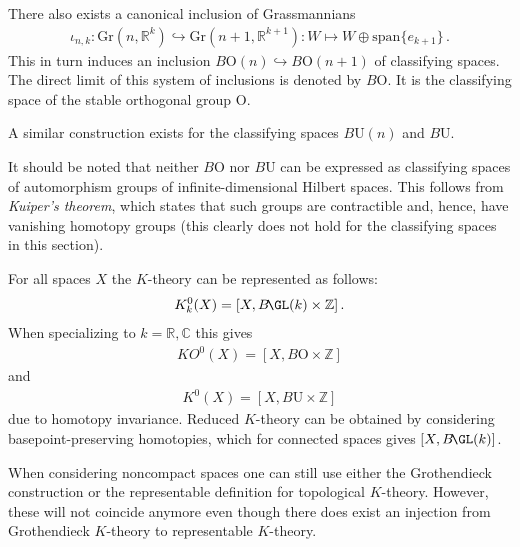 {\begin{property}
        There also exists a canonical inclusion of Grassmannians
        \begin{gather}
            \iota_{n,k}:\mathrm{Gr}(n,\mathbb{R}^k)\hookrightarrow \mathrm{Gr}(n+1,\mathbb{R}^{k+1}):W\mapsto W\oplus\mathrm{span}\{e_{k+1}\}\,.
        \end{gather}
        This in turn induces an inclusion $B\mathrm{O}(n)\hookrightarrow B\mathrm{O}(n+1)$ of classifying spaces. The direct limit of this system of inclusions is denoted by $B\mathrm{O}$. It is the classifying space of the stable orthogonal group $\mathrm{O}$.
    \end{property}
    \begin{remark}
        A similar construction exists for the classifying spaces $B\mathrm{U}(n)$ and $B\mathrm{U}$.
    \end{remark}
    \begin{remark}\label{k:kuiper_remark}
        It should be noted that neither $B\mathrm{O}$ nor $B\mathrm{U}$ can be expressed as classifying spaces of automorphism groups of infinite-dimensional Hilbert spaces. This follows from \textit{Kuiper's theorem}, which states that such groups are contractible and, hence, have vanishing homotopy groups (this clearly does not hold for the classifying spaces in this section).
    \end{remark}

    \begin{property}
        For all spaces $X$ the $K$-theory can be represented as follows:
        \begin{gather}
            K^0_k(X) = [X,B\!\GL(k)\times\mathbb{Z}]\,.
        \end{gather}
        When specializing to $k=\mathbb{R},\mathbb{C}$ this gives
        \begin{gather}
            KO^0(X) = [X,B\mathrm{O}\times\mathbb{Z}]
        \end{gather}
        and
        \begin{gather}
            K^0(X) = [X,B\mathrm{U}\times\mathbb{Z}]
        \end{gather}
        due to homotopy invariance. Reduced $K$-theory can be obtained by considering basepoint-preserving homotopies, which for connected spaces gives $[X,B\!\GL(k)]$.
    \end{property}

    \begin{remark}
        When considering noncompact spaces one can still use either the Grothendieck construction or the representable definition for topological $K$-theory. However, these will not coincide anymore even though there does exist an injection from Grothendieck $K$-theory to representable $K$-theory.
    \end{remark}

}
